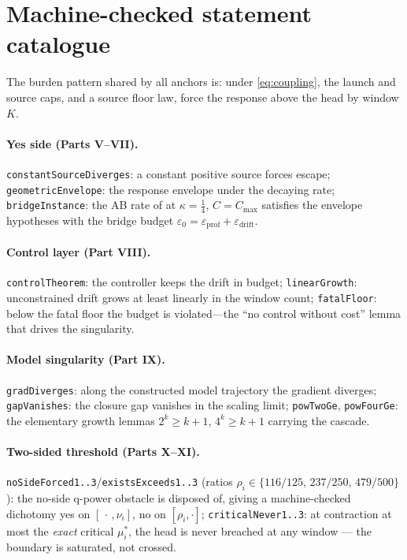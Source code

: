 \documentclass[11pt]{article}
\begin{document}
\section{Machine-checked statement catalogue}\label{sec:catalogue}

The burden pattern shared by all anchors is: under
\eqref{eq:coupling}, the launch and source caps, and a source floor law, force the response
above the head by window $K$.

\paragraph{Yes side (Parts V--VII).}
\texttt{constantSourceDiverges}: a constant positive source forces escape;
\texttt{geometricEnvelope}: the response envelope under the decaying rate;
\texttt{bridgeInstance}: the AB rate of \cite{blowup} at $\kappa=\tfrac14$, $C=C_{\max}$
satisfies the envelope hypotheses with the bridge budget $\varepsilon_0=\varepsilon_{\mathrm{prof}}+\varepsilon_{\mathrm{drift}}$.

\paragraph{Control layer (Part VIII).}
\texttt{controlTheorem}: the controller keeps the drift in budget;
\texttt{linearGrowth}: unconstrained drift grows at least linearly in the window count;
\texttt{fatalFloor}: below the fatal floor the budget is violated---the ``no control
without cost'' lemma that drives the singularity.

\paragraph{Model singularity (Part IX).}
\texttt{gradDiverges}: along the constructed model trajectory the gradient diverges;
\texttt{gapVanishes}: the closure gap vanishes in the scaling limit;
\texttt{powTwoGe}, \texttt{powFourGe}: the elementary growth lemmas
$2^k\ge k+1$, $4^k\ge k+1$ carrying the cascade.

\paragraph{Two-sided threshold (Parts X--XI).}
\texttt{noSideForced1..3}/\texttt{existsExceeds1..3} (ratios
$\rho_i\in\{116/125,\,237/250,\,479/500\}$): the no-side q-power obstacle is disposed of,
giving a machine-checked dichotomy yes on $[\,\cdot\,,\nu_i]$, no on $[\rho_i,\cdot]$;
\texttt{criticalNever1..3}: at contraction at most the \emph{exact} critical $\mu^\ast_i$,
the head is never breached at any window --- the boundary is saturated, not crossed.
\end{document}
